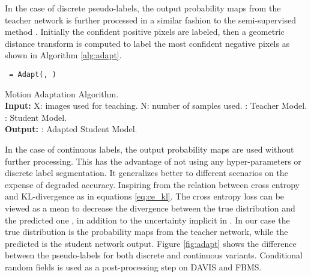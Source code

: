 \documentclass[letterpaper, 10 pt, conference]{ieeeconf}
\begin{document}
In the case of discrete pseudo-labels, the output probability maps from the teacher network is further processed in a similar fashion to the semi-supervised method \cite{voigtlaender2017online}. Initially the confident positive pixels are labeled, then a geometric distance transform is computed to label the most confident negative pixels as shown in Algorithm \ref{alg:adapt}.

\begin{algorithm}
    \begin{algorithmic}[1]
        \State \texttt{}
        \State \texttt{ = Adapt(, )}
      \EndFor
    \EndFunction
    \EndFunction
    \end{algorithmic} 
    \caption{Motion Adaptation Algorithm. \\ \textbf{Input:} X: images used for teaching. N: number of samples used. : Teacher Model. : Student Model. \\ \textbf{Output:} : Adapted Student Model.}
    \label{alg:adapt}
\end{algorithm}

In the case of continuous labels, the output probability maps are used without further processing. This has the advantage of not using any hyper-parameters or discrete label segmentation. 
It generalizes better to different scenarios on the expense of degraded accuracy. Inspiring from the relation between cross entropy and KL-divergence as in equations \ref{eq:ce_kl}. The cross entropy loss can be viewed as a mean to decrease the divergence between the true distribution  and the predicted one , in addition to the uncertainty implicit in . In our case the true distribution is the probability maps from the teacher network, while the predicted is the student network output. Figure \ref{fig:adapt} shows the difference between the pseudo-labels for both discrete and continuous variants. Conditional random fields is used as a post-processing step on DAVIS and FBMS.
\end{document}
